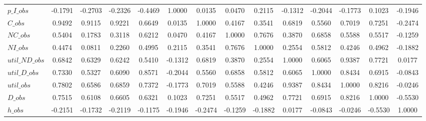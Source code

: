 \begin{center}
\begin{longtable}{lccccccccccccc}
$p\_I\_obs      $	 & 	          -0.1791	 & 	          -0.2703	 & 	          -0.2326	 & 	          -0.4469	 & 	           1.0000	 & 	           0.0135	 & 	           0.0470	 & 	           0.2115	 & 	          -0.1312	 & 	          -0.2044	 & 	          -0.1773	 & 	           0.1023	 & 	          -0.1946 \\ 
$C\_obs         $	 & 	           0.9492	 & 	           0.9115	 & 	           0.9221	 & 	           0.6649	 & 	           0.0135	 & 	           1.0000	 & 	           0.4167	 & 	           0.3541	 & 	           0.6819	 & 	           0.5560	 & 	           0.7019	 & 	           0.7251	 & 	          -0.2474 \\ 
$NC\_obs        $	 & 	           0.5404	 & 	           0.1783	 & 	           0.3118	 & 	           0.6212	 & 	           0.0470	 & 	           0.4167	 & 	           1.0000	 & 	           0.7676	 & 	           0.3870	 & 	           0.6858	 & 	           0.5588	 & 	           0.5517	 & 	          -0.1259 \\ 
$NI\_obs        $	 & 	           0.4474	 & 	           0.0811	 & 	           0.2260	 & 	           0.4995	 & 	           0.2115	 & 	           0.3541	 & 	           0.7676	 & 	           1.0000	 & 	           0.2554	 & 	           0.5812	 & 	           0.4246	 & 	           0.4962	 & 	          -0.1882 \\ 
$util\_ND\_obs  $	 & 	           0.6842	 & 	           0.6329	 & 	           0.6242	 & 	           0.5410	 & 	          -0.1312	 & 	           0.6819	 & 	           0.3870	 & 	           0.2554	 & 	           1.0000	 & 	           0.6065	 & 	           0.9387	 & 	           0.7721	 & 	           0.0177 \\ 
$util\_D\_obs   $	 & 	           0.7330	 & 	           0.5327	 & 	           0.6090	 & 	           0.8571	 & 	          -0.2044	 & 	           0.5560	 & 	           0.6858	 & 	           0.5812	 & 	           0.6065	 & 	           1.0000	 & 	           0.8434	 & 	           0.6915	 & 	          -0.0843 \\ 
$util\_obs      $	 & 	           0.7802	 & 	           0.6586	 & 	           0.6859	 & 	           0.7372	 & 	          -0.1773	 & 	           0.7019	 & 	           0.5588	 & 	           0.4246	 & 	           0.9387	 & 	           0.8434	 & 	           1.0000	 & 	           0.8216	 & 	          -0.0246 \\ 
$D\_obs         $	 & 	           0.7515	 & 	           0.6108	 & 	           0.6605	 & 	           0.6321	 & 	           0.1023	 & 	           0.7251	 & 	           0.5517	 & 	           0.4962	 & 	           0.7721	 & 	           0.6915	 & 	           0.8216	 & 	           1.0000	 & 	          -0.5530 \\ 
$h\_obs         $	 & 	          -0.2151	 & 	          -0.1732	 & 	          -0.2119	 & 	          -0.1175	 & 	          -0.1946	 & 	          -0.2474	 & 	          -0.1259	 & 	          -0.1882	 & 	           0.0177	 & 	          -0.0843	 & 	          -0.0246	 & 	          -0.5530	 & 	           1.0000 \\ 
\end{longtable}
 \end{center}
